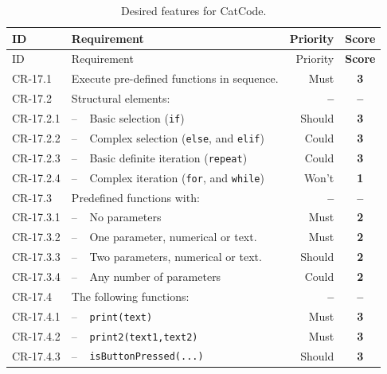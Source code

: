 \begin{center}
  \begin{longtable}{lp{0.5cm}p{7cm}rc}
    \caption{Desired features for CatCode.} \label{tab:results/cr/catCode-features} \\
    \toprule
    ID
    & \multicolumn{2}{l}{Requirement}
    & Priority
    & \textbf{Score} \\ \midrule
    \endfirsthead
    \toprule
    ID
    & \multicolumn{2}{l}{Requirement}
    & Priority
    & \textbf{Score}\\ \midrule
    \endhead
    CR-17.1
    & \multicolumn{2}{l}{Execute pre-defined functions in sequence.}
    & Must
    & \textbf{3}
    \\
    CR-17.2
    & \multicolumn{2}{l}{Structural elements:}
    & \textbf{--}
    & \textbf{--}
    \\
    CR-17.2.1
    & -- & Basic selection (\texttt{if})
    & Should
    & \textbf{3}
    \\
    CR-17.2.2
    & -- & Complex selection (\texttt{else}, and \texttt{elif})
    & Could
    & \textbf{3}
    \\
    CR-17.2.3
    & -- & Basic definite iteration (\texttt{repeat})
    & Could
    & \textbf{3}
    \\
    CR-17.2.4
    & -- & Complex iteration (\texttt{for}, and \texttt{while})
    & Won't
    & \textbf{1}
    \\
    CR-17.3
    & \multicolumn{2}{l}{Predefined functions with:}
    & \textbf{--}
    & \textbf{--}
    \\
    CR-17.3.1
    & -- & No parameters
    & Must
    & \textbf{2}
    \\
    CR-17.3.2
    & -- & One parameter, numerical or text.
    & Must
    & \textbf{2}
    \\
    CR-17.3.3
    & -- & Two parameters, numerical or text.
    & Should
    & \textbf{2}
    \\
    CR-17.3.4
    & -- & Any number of parameters
    & Could
    & \textbf{2}
    \\
    CR-17.4
    & \multicolumn{2}{l}{The following functions:}
    & \textbf{--}
    & \textbf{--}
    \\
    CR-17.4.1
    & -- & \texttt{print(text)}
    & Must
    & \textbf{3}
    \\
    CR-17.4.2
    & -- & \texttt{print2(text1,text2)}
    & Must
    & \textbf{3}
    \\
    CR-17.4.3
    & -- & \texttt{isButtonPressed(...)}
    & Should
    & \textbf{3}

\end{longtable}
\end{center}
